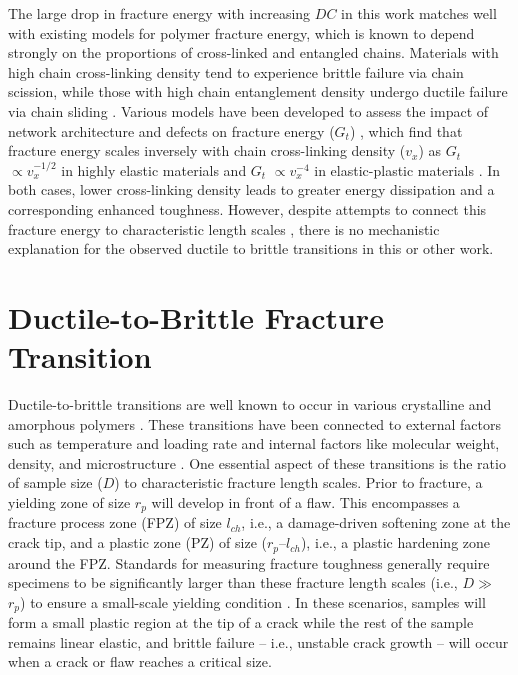 \documentclass[11pt]{article}
\providecommand{\rp}[0]{$r_p$}
\providecommand{\lch}[0]{$l_{ch}$}
\providecommand{\DC}[0]{$DC$}
\providecommand{\Gt}[0]{$G_{t}$}
\begin{document}
        The large drop in fracture energy with increasing \DC{} in this work matches well with existing models for polymer fracture energy, which is known to depend strongly on the proportions of cross-linked and entangled chains. 
        Materials with high chain cross-linking density tend to experience brittle failure via chain scission, while those with high chain entanglement density undergo ductile failure via chain sliding \cite{zhurkov1974atomic, wang2014phenomenological, dookhith2022tailoring}.
        Various models have been developed to assess the impact of network architecture and defects on fracture energy (\Gt{}) \cite{lake1967strength, arora2020fracture, lin2021fracture}, which find that fracture energy scales inversely with chain cross-linking density ($v_x$) as \Gt{} $\propto v_{x}^{-1/2}$ in highly elastic materials and \Gt{} $\propto v_{x}^{-4}$ in elastic-plastic materials \cite{dookhith2022tailoring}.
        In both cases, lower cross-linking density leads to greater energy dissipation and a corresponding enhanced toughness.
        However, despite attempts to connect this fracture energy to characteristic length scales \cite{dookhith2022tailoring, brown1982model}, there is no mechanistic explanation for the observed ductile to brittle transitions in this or other work.
        
    \section{Ductile-to-Brittle Fracture Transition}
        Ductile-to-brittle transitions are well known to occur in various crystalline and amorphous polymers \cite{brown1982model, quagliato2022quasi, argon2003toughenability}. 
        These transitions have been connected to external factors such as temperature and loading rate and internal factors like molecular weight, density, and microstructure \cite{brown1982model}. 
        One essential aspect of these transitions is the ratio of sample size ($D$) to characteristic fracture length scales.
        Prior to fracture, a yielding zone of size \rp{} will develop in front of a flaw. 
        This encompasses a fracture process zone (FPZ) of size \lch{}, i.e., a damage-driven softening zone at the crack tip, and a plastic zone (PZ) of size (\rp{}--\lch{}), i.e., a plastic hardening zone around the FPZ.
        Standards for measuring fracture toughness generally require specimens to be significantly larger than these fracture length scales (i.e., $D \gg$ \rp{}) to ensure a small-scale yielding condition \cite{ASTM-E1820}.
        In these scenarios, samples will form a small plastic region at the tip of a crack while the rest of the sample remains linear elastic, and brittle failure -- i.e., unstable crack growth -- will occur when a crack or flaw reaches a critical size.
\end{document}
